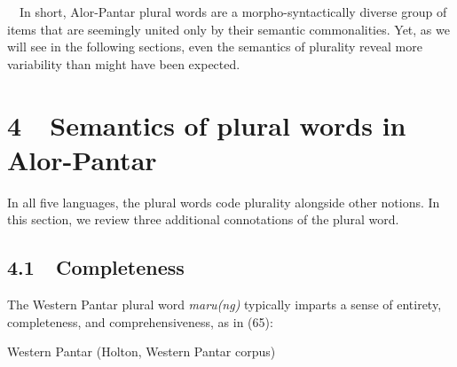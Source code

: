 \ \ In short, Alor-Pantar plural words are a morpho-syntactically diverse group of items that are seemingly united only by their semantic commonalities. Yet, as we will see in the following sections, even the semantics of plurality reveal more variability than might have been expected.

\section[4\ \ Semantics of plural words in Alor{}-Pantar ]{4\ \ Semantics of plural words in Alor-Pantar }
In all five languages, the plural words code plurality alongside other notions. In this section, we review three additional connotations of the plural word.

\subsection[4.1\ \ Completeness]{4.1\ \ Completeness}
The Western Pantar plural word \textit{maru(ng) }typically imparts a sense of entirety, completeness, and comprehensiveness, as in (65):

Western Pantar (Holton, Western Pantar corpus)

